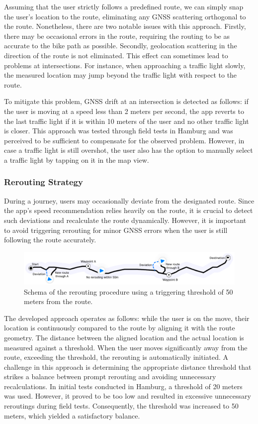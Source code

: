 Assuming that the user strictly follows a predefined route, we can simply snap the user's location to the route, eliminating any GNSS scattering orthogonal to the route. Nonetheless, there are two notable issues with this approach. Firstly, there may be occasional errors in the route, requiring the routing to be as accurate to the bike path as possible. Secondly, geolocation scattering in the direction of the route is not eliminated. This effect can sometimes lead to problems at intersections. For instance, when approaching a traffic light slowly, the measured location may jump beyond the traffic light with respect to the route. 

To mitigate this problem, GNSS drift at an intersection is detected as follows: if the user is moving at a speed less than 2 meters per second, the app reverts to the last traffic light if it is within 10 meters of the user and no other traffic light is closer. This approach was tested through field tests in Hamburg and was perceived to be sufficient to compensate for the observed problem. However, in case a traffic light is still overshot, the user also has the option to manually select a traffic light by tapping on it in the map view.

\subsubsection{Rerouting Strategy}

During a journey, users may occasionally deviate from the designated route. Since the app's speed recommendation relies heavily on the route, it is crucial to detect such deviations and recalculate the route dynamically. However, it is important to avoid triggering rerouting for minor GNSS errors when the user is still following the route accurately.

\begin{figure}[htbp]
\centering
\includegraphics[width=\linewidth]{images/rerouting-strategy.pdf}
\caption{Schema of the rerouting procedure using a triggering threshold of 50 meters from the route.}
\label{fig:rerouting-strategy}
\end{figure}

The developed approach operates as follows: while the user is on the move, their location is continuously compared to the route by aligning it with the route geometry. The distance between the aligned location and the actual location is measured against a threshold. When the user moves significantly away from the route, exceeding the threshold, the rerouting is automatically initiated. A challenge in this approach is determining the appropriate distance threshold that strikes a balance between prompt rerouting and avoiding unnecessary recalculations. In initial tests conducted in Hamburg, a threshold of 20 meters was used. However, it proved to be too low and resulted in excessive unnecessary reroutings during field tests. Consequently, the threshold was increased to 50 meters, which yielded a satisfactory balance.

